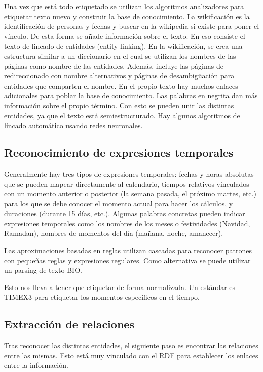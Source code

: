 Una vez que está todo etiquetado se utilizan los algoritmos analizadores para etiquetar texto nuevo y construir la base de conocimiento. La wikificación es la identificación de personas y fechas y buscar en la wikipedia si existe para poner el vínculo. De esta forma se añade información sobre el texto. En eso consiste el texto de lincado de entidades (entity linking). En la wikificación, se crea una estructura similar a un diccionario en el cual se utilizan los nombres de las páginas como nombre de las entidades. Además, incluye las páginas de redireccionado con nombre alternativos y páginas de desambigüación para entidades que comparten el nombre. En el propio texto hay muchos enlaces adicionales para poblar la base de conocimiento. Las palabras en negrita dan más información sobre el propio término. Con esto se pueden unir las distintas entidades, ya que el texto está semiestructurado. Hay algunos algoritmos de lincado automático usando redes neuronales.

\subsection{Reconocimiento de expresiones temporales}
Generalmente hay tres tipos de expresiones temporales: fechas y horas absolutas que se pueden mapear directamente al calendario, tiempos relativos vinculados con un momento anterior o posterior (la semana pasada, el próximo martes, etc.) para los que se debe conocer el momento actual para hacer los cálculos, y duraciones (durante 15 días, etc.). Algunas palabras concretas pueden indicar expresiones temporales como los nombres de los meses o festividades (Navidad, Ramadan), nombres de momentos del día (mañana, noche, amanecer). 

Las aproximaciones basadas en reglas utilizan cascadas para reconocer patrones con pequeñas reglas y expresiones regulares. Como alternativa se puede utilizar un parsing de texto BIO.

Esto nos lleva a tener que etiquetar de forma normalizada. Un estándar es TIMEX3 para etiquetar los momentos específicos en el tiempo. 

\subsection{Extracción de relaciones}
Tras reconocer las distintas entidades, el siguiente paso es encontrar las relaciones entre las mismas. Esto está muy vinculado con el RDF para establecer los enlaces entre la información. 

